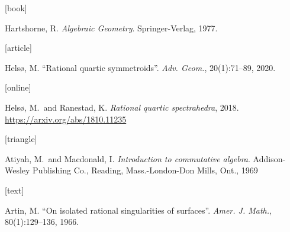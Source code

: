 [book]

Hartshorne, R.
\newblock \emph{Algebraic Geometry}.
\newblock Springer-Verlag, 1977.

[article]

Helsø, M.
\newblock \enquote{Rational quartic symmetroids}.
\newblock \emph{Adv. Geom.}, 20(1):71--89, 2020.

[online]

Helsø, M.\ and Ranestad, K.
\newblock \emph{Rational quartic spectrahedra}, 2018.
\newblock \url{https://arxiv.org/abs/1810.11235}

[triangle]

Atiyah, M.\ and Macdonald, I.
\newblock \emph{Introduction to commutative algebra}.
\newblock Addison-Wesley Publishing Co., Reading, Mass.-London-Don
Mills, Ont., 1969

[text]

Artin, M.
\newblock \enquote{On isolated rational singularities of surfaces}.
\newblock \emph{Amer. J. Math.}, 80(1):129--136, 1966.